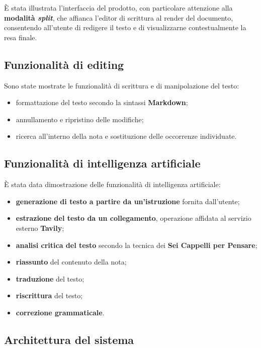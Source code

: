 \documentclass[a4paper, 10pt, colorlinks=true, linkcolor=black, urlcolor=blue, citecolor=blue, hidelinks]{article}
\begin{document}
È stata illustrata l'interfaccia del prodotto, con particolare attenzione alla \textbf{modalità \textit{split}}, che affianca l'editor di scrittura al render del documento, consentendo all'utente di redigere il testo e di visualizzarne contestualmente la resa finale.

\subsection{Funzionalità di editing}

Sono state mostrate le funzionalità di scrittura e di manipolazione del testo:

\begin{itemize}
    \item formattazione del testo secondo la sintassi \textbf{Markdown};
    \item annullamento e ripristino delle modifiche;
    \item ricerca all'interno della nota e sostituzione delle occorrenze individuate.
\end{itemize}

\subsection{Funzionalità di intelligenza artificiale}

È stata data dimostrazione delle funzionalità di intelligenza artificiale:

\begin{itemize}
    \item \textbf{generazione di testo a partire da un'istruzione} fornita dall'utente;
    \item \textbf{estrazione del testo da un collegamento}, operazione affidata al servizio esterno \textbf{Tavily};
    \item \textbf{analisi critica del testo} secondo la tecnica dei \textbf{Sei Cappelli per Pensare};
    \item \textbf{riassunto} del contenuto della nota;
    \item \textbf{traduzione} del testo;
    \item \textbf{riscrittura} del testo;
    \item \textbf{correzione grammaticale}.
\end{itemize}

\subsection{Architettura del sistema}
\end{document}
